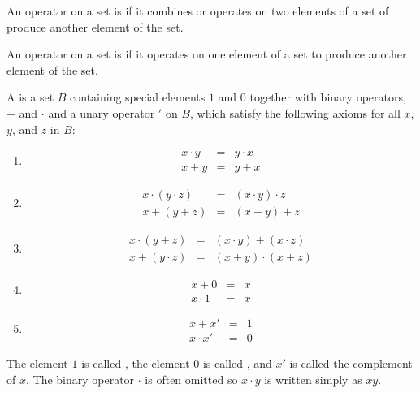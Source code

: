 \begin{definition}
  An operator on a set is  if it combines or operates on two elements of a set of produce another element of the set.
\end{definition}

\begin{definition}
  An operator on a set is  if it operates on one element of a set to produce another element of the set.
\end{definition}

\begin{definition}
  A  is a set $B$ containing special elements $1$ and $0$ together with binary operators, $+$ and $\cdot$ and a unary operator $'$ on $B$, which satisfy the following axioms for all $x$, $y$, and $z$ in $B$:
  \begin{enumerate}[label=\alph*.]
    \item {}
    \begin{eqnarray*}
    x \cdot y & = & y \cdot x \\
    x + y & = & y + x
    \end{eqnarray*}
    \item {}
    \begin{eqnarray*}
      x \cdot (y \cdot z) & = & (x \cdot y) \cdot z\\
      x + (y + z) & = & (x + y) + z
    \end{eqnarray*}
    \item {}
    \begin{eqnarray*}
      x \cdot (y + z) & = & (x \cdot y) + (x \cdot z)\\
      x + (y \cdot z) & = & (x + y) \cdot (x + z)
    \end{eqnarray*}
    \item {}
    \begin{eqnarray*}
      x + 0 & = & x \\
      x \cdot 1 & = & x
    \end{eqnarray*}
    \item {}
    \begin{eqnarray*}
      x + x' & = & 1 \\
      x \cdot x' & = & 0
    \end{eqnarray*}
  \end{enumerate}
  The element $1$ is called , the element $0$ is called , and $x'$ is called the complement of $x$. The binary operator $\cdot$ is often omitted so $x \cdot y$ is written simply as $xy$.
\end{definition}

